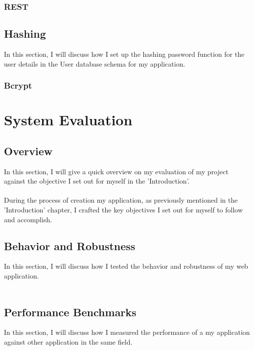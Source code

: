 \subsection{REST}

\section{Hashing}

In this section, I will discuss how I set up the hashing password function for the user details in the User database schema for my application.

\subsection{Bcrypt}

\chapter{System Evaluation}

\section{Overview}

In this section, I will give a quick overview on my evaluation of my project against the objective I set out for myself in the 'Introduction'.\\ \\
During the process of creation my application, as previously mentioned in the 'Introduction' chapter, I crafted the key objectives I set out for myself to follow and accomplish.

\section{Behavior and Robustness}

In this section, I will discuss how I tested the behavior and robustness of my web application.\\ \\

\section{Performance Benchmarks}

In this section, I will discuss how I measured the performance of a my application against other application in the same field.\\ \\


